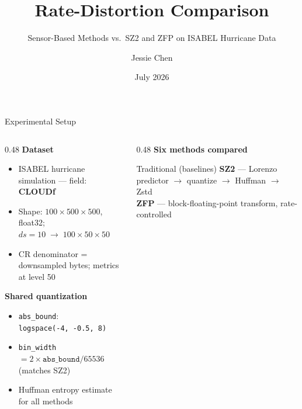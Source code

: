 \documentclass[aspectratio=169, 11pt]{beamer}
\title{Rate-Distortion Comparison}
\subtitle{Sensor-Based Methods vs.\ SZ2 and ZFP on ISABEL Hurricane Data}
\author{Jessie Chen}
\institute{Argonne National Laboratory}
\date{July 2026}
\begin{document}

\maketitle

\begin{frame}{Experimental Setup}
\begin{columns}[T]

\begin{column}{0.48\textwidth}
  \textcolor{cteal}{\textbf{Dataset}}\vspace{0.15em}
  \begin{itemize}\setlength\itemsep{0.2em}\small
    \item ISABEL hurricane simulation — field: \textbf{CLOUDf}
    \item Shape: $100\!\times\!500\!\times\!500$, float32; $ds=10\;\to\;100\!\times\!50\!\times\!50$
    \item CR denominator = downsampled bytes; metrics at level 50
  \end{itemize}

  \vspace{0.35em}
  \textcolor{cteal}{\textbf{Shared quantization}}\vspace{0.15em}
  \begin{itemize}\setlength\itemsep{0.2em}\small
    \item \texttt{abs\_bound}: \texttt{logspace(-4,\,-0.5,\,8)}
    \item \texttt{bin\_width} $= 2\!\times\!\texttt{abs\_bound}/65536$ (matches SZ2)
    \item Huffman entropy estimate for all methods
  \end{itemize}
\end{column}

\begin{column}{0.48\textwidth}
  \textcolor{cteal}{\textbf{Six methods compared}}\vspace{0.2em}

  \begingroup
  \begin{block}{Traditional (baselines)}
    \scriptsize
    \textbf{SZ2} — Lorenzo predictor $\to$ quantize $\to$ Huffman $\to$ Zstd\\
    \textbf{ZFP} — block-floating-point transform, rate-controlled
  \end{block}
  \endgroup


\end{column}
\end{columns}
\end{frame}
\end{document}
